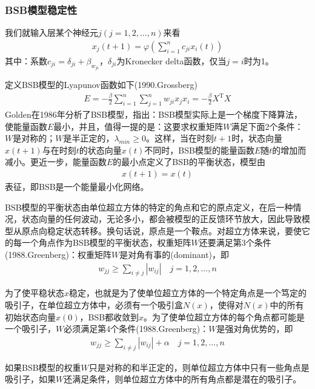         \subsubsection{BSB模型稳定性}
            \par
            我们就输入层某个神经元$j(j=1,2,\dots,n)$来看
            \begin{align*}
            x_j(t+1) = \varphi \left( \sum_{i=1}^n c_{ji}x_i(t) \right)
            \end{align*}
            其中：系数$c_{ji} = \delta_{ji}+\beta_{w_{ji}}$，$\delta_{ji}$为Kronecker delta函数，仅当$j=i$时为1。
            \par
            定义BSB模型的Lyapunov函数如下(1990.Grossberg)
            \begin{align*}
            E = -\frac{\beta}{2} \sum_{i=1}^n\sum_{j=1}^n w_{ji}x_jx_i = -\frac{\beta}{2} X^\mathrm{T} X
            \end{align*}
            Golden在1986年分析了BSB模型，指出：BSB模型实际上是一个梯度下降算法，使能量函数$E$最小，并且，值得一提的是：这要求权重矩阵$W$满足下面2个条件：$W$是对称的；$W$是半正定的，$\lambda_{min} \geqslant 0$。这样，当在时刻$t+1$时，状态向量$x(t+1)$与在时刻$t$的状态向量$x(t)$不同时，BSB模型的能量函数$E$随$t$的增加而减小。更近一步，能量函数$E$的最小点定义了BSB的平衡状态，模型由
            \begin{align*}
            x(t+1) = x(t)
            \end{align*}
            表征，即BSB是一个能量最小化网络。
            \par
            BSB模型的平衡状态由单位超立方体的特定的角点和它的原点定义，在后一种情况，状态向量的任何波动，无论多小，都会被模型的正反馈环节放大，因此导致模型从原点向稳定状态转移。换句话说，原点是一个鞍点。对超立方体来说，要使它的每一个角点作为BSB模型的平衡状态，权重矩阵$W$还要满足第3个条件(1988.Greenberg)：权重矩阵$W$是对角有事的(dominant)，即
            \begin{align*}
            w_{jj} \geqslant \sum_{i \neq j}|w_{ij}| \quad j= 1,2,\dots,n
            \end{align*}
            \par
            为了使平稳状态$x$稳定，也就是为了使单位超立方体的一个特定角点是一个笃定的吸引子，在单位超立方体中，必须有一个吸引盒$N(x)$，使得对$N(x)$中的所有初始状态向量$x(0)$，BSB都收敛到$x$。为了使单位超立方体的每个角点都可能是一个吸引子，$W$必须满足第4个条件(1988.Greenberg)：$W$是强对角优势的，即
            \begin{align*}
            w_{jj} \geqslant \sum_{i \neq j}|w_{ij}|+\alpha \quad j= 1,2,\dots,n
            \end{align*}
            \par
            如果BSB模型的权重$W$只是对称的和半正定的，则单位超立方体中只有一些角点是吸引子，如果$W$还满足条件，则单位超立方体中的所有角点都是潜在的吸引子。

